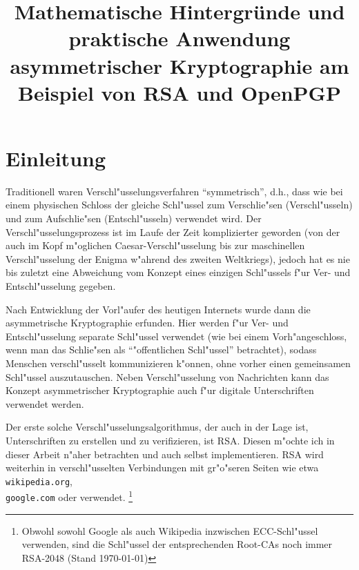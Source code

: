 \documentclass[12pt]{article}
\title{Mathematische Hintergr\"unde und praktische Anwendung asymmetrischer Kryptographie am Beispiel von RSA und OpenPGP}
\begin{document}
\maketitle
\thispagestyle{empty}
\newpage
\tableofcontents
\thispagestyle{empty}
\newpage

\section{Einleitung}

Traditionell waren Verschl"usselungsverfahren "`symmetrisch"', d.h., dass wie bei einem physischen Schloss
der gleiche Schl"ussel zum Verschlie"sen (Verschl"usseln) und zum Aufschlie"sen (Entschl"usseln) verwendet wird.
Der Ver\-schl"us\-sel\-ungs\-pro\-zess ist im Laufe der Zeit komplizierter geworden
(von der auch im Kopf m"oglichen Caesar-Verschl"usselung bis zur
maschinellen Verschl"usselung der Enigma w"ah\-rend des zweiten Weltkriegs),
jedoch hat es nie bis zuletzt
eine Abweichung vom Konzept eines einzigen Schl"ussels f"ur Ver- und Entschl"usselung gegeben.

Nach Entwicklung der Vorl"aufer des heutigen Internets wurde dann die asymmetrische Kryptographie erfunden.
Hier werden f"ur Ver- und Entschl"usselung separate Schl"ussel verwendet
(wie bei einem Vorh"angeschloss, wenn man das Schlie"sen als "`"offentlichen Schl"ussel"' betrachtet),
sodass Menschen verschl"usselt kom\-mu\-ni\-zie\-ren k"onnen, ohne vorher einen gemeinsamen Schl"ussel auszutauschen.
Neben Verschl"usselung von Nachrichten kann das Konzept asymmetrischer Kryptographie
auch f"ur digitale Unterschriften verwendet werden.

Der erste solche Verschl"usselungsalgorithmus, der auch in der Lage ist, Unterschriften zu erstellen und zu verifizieren, ist RSA\@.
Diesen m"ochte ich in dieser Arbeit n"aher betrachten und auch selbst implementieren.
RSA wird weiterhin in verschl"usselten Verbindungen mit gr"o"seren Seiten
wie etwa \texttt{wikipedia.org}, \\ \texttt{google.com} oder \piibigsite{} verwendet.%
\footnote{Obwohl sowohl Google als auch Wikipedia inzwischen ECC-Schl"ussel verwenden,
sind die Schl"ussel der entsprechenden Root-CAs noch immer RSA-2048 (Stand \today)}
\end{document}
